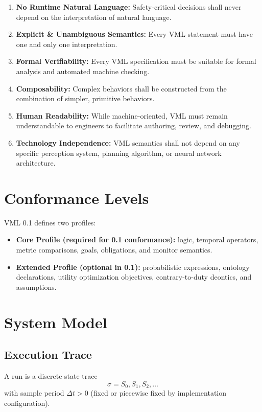 \documentclass[11pt,a4paper]{article}
\begin{document}
\begin{enumerate}
    \item \textbf{No Runtime Natural Language:} Safety-critical decisions shall never depend on the interpretation of natural language.
    \item \textbf{Explicit \& Unambiguous Semantics:} Every VML statement must have one and only one interpretation.
    \item \textbf{Formal Verifiability:} Every VML specification must be suitable for formal analysis and automated machine checking.
    \item \textbf{Composability:} Complex behaviors shall be constructed from the combination of simpler, primitive behaviors.
    \item \textbf{Human Readability:} While machine-oriented, VML must remain understandable to engineers to facilitate authoring, review, and debugging.
    \item \textbf{Technology Independence:} VML semantics shall not depend on any specific perception system, planning algorithm, or neural network architecture.
\end{enumerate}

\section{Conformance Levels}
VML 0.1 defines two profiles:
\begin{itemize}[leftmargin=*]
  \item \textbf{Core Profile (required for 0.1 conformance):} logic, temporal operators, metric comparisons, goals, obligations, and monitor semantics.
  \item \textbf{Extended Profile (optional in 0.1):} probabilistic expressions, ontology declarations, utility optimization objectives, contrary-to-duty deontics, and assumptions.
\end{itemize}

\section{System Model}
\subsection{Execution Trace}
A run is a discrete state trace
\[
\sigma = S_0, S_1, S_2, \dots
\]
with sample period $\Delta t > 0$ (fixed or piecewise fixed by implementation configuration).
\end{document}
